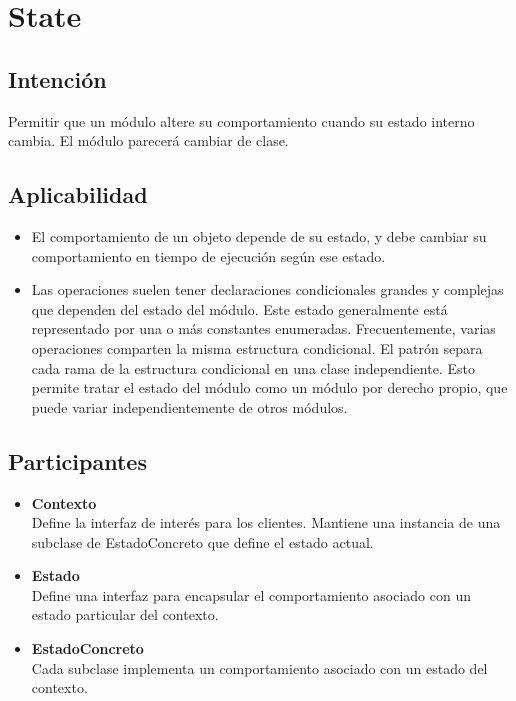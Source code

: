 \section{State}


\subsection*{Intención}

Permitir que un módulo altere su comportamiento cuando su estado interno cambia. El módulo parecerá cambiar de clase.

\subsection*{Aplicabilidad}

\begin{itemize}
\item El comportamiento de un objeto depende de su estado, y debe cambiar su comportamiento en tiempo de ejecución según ese estado.
\item Las operaciones suelen tener declaraciones condicionales grandes y complejas que dependen del estado del módulo. Este estado generalmente está representado por una o más constantes enumeradas. Frecuentemente, varias operaciones comparten la misma estructura condicional. El patrón separa cada rama de la estructura condicional en una clase independiente. Esto permite tratar el estado del módulo como un módulo por derecho propio, que puede variar independientemente de otros módulos.
\end{itemize}

\subsection*{Participantes}

\begin{itemize}
\item \textbf{Contexto}\\
Define la interfaz de interés para los clientes. Mantiene una instancia de una subclase de EstadoConcreto que define el estado actual.

\item \textbf{Estado}\\
Define una interfaz para encapsular el comportamiento asociado con un estado particular del contexto.

\item \textbf{EstadoConcreto}\\
Cada subclase implementa un comportamiento asociado con un estado del contexto.
\end{itemize}


